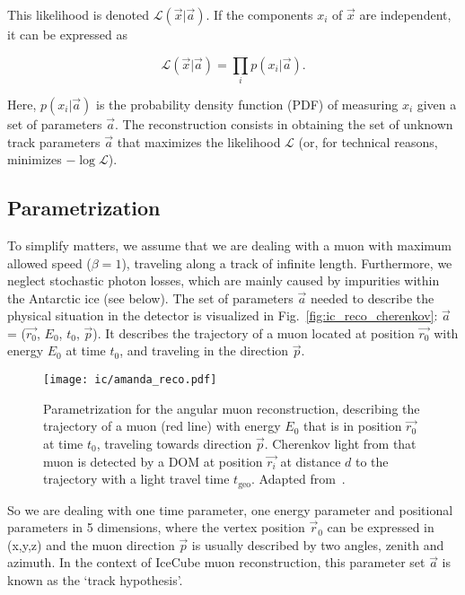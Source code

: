 This likelihood is denoted $\mathcal{L}(\vec{x}|\vec{a})$. If the components $x_i$ of $\vec{x}$ are independent, it can be expressed as

\begin{equation}
    \mathcal{L}(\vec{x}|\vec{a}) = \prod_i p(x_i|\vec{a}).
\end{equation}

Here, $p(x_i|\vec{a})$ is the probability density function (PDF) of measuring $x_i$ given a set of parameters $\vec{a}$. The reconstruction consists in obtaining the set of unknown track parameters $\vec{a}$ that maximizes the likelihood $\mathcal{L}$ (or, for technical reasons, minimizes $-\log{\mathcal{L}}$).

\subsection{Parametrization}

To simplify matters, we assume that we are dealing with a muon with maximum allowed speed ($\beta=1$), traveling along a track of infinite length. Furthermore, we neglect stochastic photon losses, which are mainly caused by impurities within the Antarctic ice (see below). The set of parameters $\vec{a}$ needed to describe the physical situation in the detector is visualized in Fig.~\ref{fig:ic_reco_cherenkov}: $\vec{a}$ = ($\vec{r_0}$, $E_0$, $t_0$, $\vec{p}$). It describes the trajectory of a muon located at position $\vec{r_0}$ with energy $E_0$ at time $t_0$, and traveling in the direction $\vec{p}$.

\begin{figure}[htb]
    \texttt{[image: ic/amanda\_reco.pdf]}
    \caption[Angular reconstruction in IceCube]{Parametrization for the angular muon reconstruction, describing the trajectory of a muon (red line) with energy $E_0$ that is in position $\vec{r_0}$ at time $t_0$, traveling towards direction $\vec{p}$. Cherenkov light from that muon is detected by a DOM at position $\vec{r_i}$ at distance $d$ to the trajectory with a light travel time $t_\text{geo}$. Adapted from~\cite{Ahrens2004}.}
\end{figure}

So we are dealing with one time parameter, one energy parameter and positional parameters in 5 dimensions, where the vertex position $\vec{r}_0$ can be expressed in (x,y,z) and the muon direction $\vec{p}$ is usually described by two angles, zenith and azimuth. In the context of IceCube muon reconstruction, this parameter set $\vec{a}$ is known as the `track hypothesis'.


